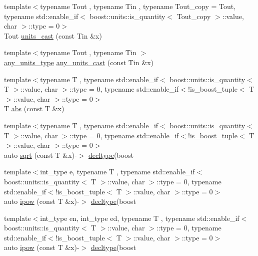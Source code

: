 \begin{DoxyCompactItemize}
\item 
{\footnotesize template$<$typename Tout , typename Tin , typename Tout\-\_\-copy  = Tout, typename std\-::enable\-\_\-if$<$ boost\-::units\-::is\-\_\-quantity$<$ Tout\-\_\-copy $>$\-::value, char $>$\-::type  = 0$>$ }\\Tout \hyperlink{namespaceIceBRG_ad862134d7bd92597d38ee7e67b4f0b90}{units\-\_\-cast} (const Tin \&x)
\item 
{\footnotesize template$<$typename Tout , typename Tin $>$ }\\\hyperlink{namespaceIceBRG_a3101fc159e191fa99c4ec14e445df96e}{any\-\_\-units\-\_\-type} \hyperlink{namespaceIceBRG_ad9815b4f9bbc60d3b6698d63738a6adb}{any\-\_\-units\-\_\-cast} (const Tin \&x)
\item 
{\footnotesize template$<$typename T , typename std\-::enable\-\_\-if$<$ boost\-::units\-::is\-\_\-quantity$<$ T $>$\-::value, char $>$\-::type  = 0, typename std\-::enable\-\_\-if$<$!is\-\_\-boost\-\_\-tuple$<$ T $>$\-::value, char $>$\-::type  = 0$>$ }\\T \hyperlink{namespaceIceBRG_a4c7e2f9b86e76cd9cca67a355b2817e3}{abs} (const T \&x)
\item 
{\footnotesize template$<$typename T , typename std\-::enable\-\_\-if$<$ boost\-::units\-::is\-\_\-quantity$<$ T $>$\-::value, char $>$\-::type  = 0, typename std\-::enable\-\_\-if$<$!is\-\_\-boost\-\_\-tuple$<$ T $>$\-::value, char $>$\-::type  = 0$>$ }\\auto \hyperlink{namespaceIceBRG_a9eaa1969c120d6b466ce05f895f9684f}{sqrt} (const T \&x)-\/$>$ \hyperlink{namespaceIceBRG_a528e5024ecab03049320529180ae84a8}{decltype}(boost
\item 
{\footnotesize template$<$int\-\_\-type e, typename T , typename std\-::enable\-\_\-if$<$ boost\-::units\-::is\-\_\-quantity$<$ T $>$\-::value, char $>$\-::type  = 0, typename std\-::enable\-\_\-if$<$!is\-\_\-boost\-\_\-tuple$<$ T $>$\-::value, char $>$\-::type  = 0$>$ }\\auto \hyperlink{namespaceIceBRG_aa481516ced5bf468b991464da89b6a81}{ipow} (const T \&x)-\/$>$ \hyperlink{namespaceIceBRG_a528e5024ecab03049320529180ae84a8}{decltype}(boost
\item 
{\footnotesize template$<$int\-\_\-type en, int\-\_\-type ed, typename T , typename std\-::enable\-\_\-if$<$ boost\-::units\-::is\-\_\-quantity$<$ T $>$\-::value, char $>$\-::type  = 0, typename std\-::enable\-\_\-if$<$!is\-\_\-boost\-\_\-tuple$<$ T $>$\-::value, char $>$\-::type  = 0$>$ }\\auto \hyperlink{namespaceIceBRG_a842ec4995f2cb4e8fb8f76af88d65582}{ipow} (const T \&x)-\/$>$ \hyperlink{namespaceIceBRG_a528e5024ecab03049320529180ae84a8}{decltype}(boost

\end{DoxyCompactItemize}
